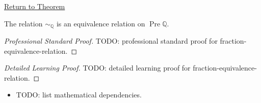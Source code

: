 \newpage
{}
\label{prf:fraction-equivalence-relation}

\begin{remark*}[Return]
\hyperref[thm:fraction-equivalence-relation]{Return to Theorem}
\end{remark*}

\begin{theorem*}
The relation $\sim_{\mathbb{Q}}$ is an equivalence relation on
$\operatorname{Pre}\mathbb{Q}$.
\end{theorem*}

\begin{proof}[Professional Standard Proof]
\LRAProofBodyStart
TODO: professional standard proof for fraction-equivalence-relation.
\end{proof}

\begin{proof}[Detailed Learning Proof]
\LRAProofBodyStart
TODO: detailed learning proof for fraction-equivalence-relation.
\end{proof}

\begin{remark*}
\end{remark*}

\begin{dependencies}
\begin{itemize}
  \item TODO: list mathematical dependencies.
\end{itemize}
\end{dependencies}

\clearpage
